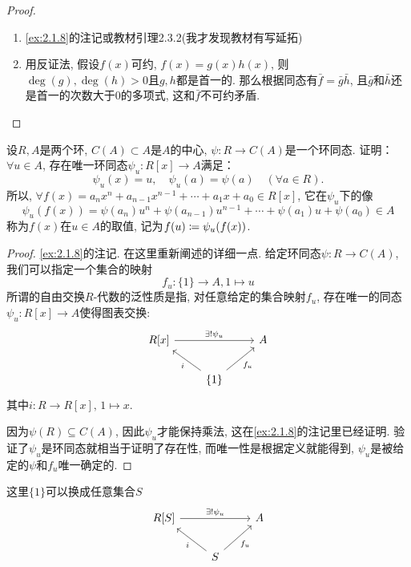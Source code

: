 \begin{proof}
    \begin{enumerate}[(1)]
        \item \ref{ex:2.1.8}的注记或教材引理2.3.2(我才发现教材有写延拓)
        \item 用反证法, 假设$f(x)$可约, $f(x) = g(x)h(x)$, 则$\deg(g), \deg(h) > 0$且$g, h$都是首一的. 那么根据同态有$\bar{f} = \bar{g}\bar{h}$, 且$\bar{g}$和$\bar{h}$还是首一的次数大于$0$的多项式, 这和$\bar{f}$不可约矛盾.
    \end{enumerate}
\end{proof}

\begin{problem}
    设$R, A$是两个环, $C(A) \subset A$是$A$的中心,
$\psi:R \to C(A)$是一个环同态. 证明：$\forall u \in A$,
存在唯一环同态$\psi_u:R[x] \to A$满足：
\[
    \psi_u(x) = u,\quad \psi_u(a) = \psi(a) \quad (\forall a \in R).
\]
所以, $\forall f(x) = a_nx^n + a_{n - 1}x^{n - 1} + \cdots + a_1x + a_0 \in R[x]$,
它在$\psi_u$下的像
\[
    \psi_u(f(x)) = \psi(a_n)u^n + \psi(a_{n - 1})u^{n - 1} + \cdots + \psi(a_1)u + \psi(a_0) \in A
\]
称为$f(x)$在$u \in A$的取值, 记为$f(u) \mathrel{\coloneqq} \psi_u(f(x))$.
\end{problem}

\begin{proof}
    \ref{ex:2.1.8}的注记. 在这里重新阐述的详细一点. 给定环同态$\psi:R \to C(A)$, 我们可以指定一个集合的映射
    \[
        f_u:\{1\} \to A, 1 \mapsto u
    \]
    所谓的自由交换$R$-代数的泛性质是指, 对任意给定的集合映射$f_u$, 存在唯一的同态$\psi_u:R[x] \to A$使得图表交换:
    \[
        \begin{tikzcd}
            {R[x]} \arrow[rr, "\exists!\psi_u"] &                                          & A \\
                                                & \{1\} \arrow[lu, "i"] \arrow[ru, "f_u"'] &  
        \end{tikzcd}
    \]
    其中$i:R \to R[x],\, 1 \mapsto x$.

    因为$\psi(R) \subseteq C(A)$, 因此$\psi_u$才能保持乘法, 这在\ref{ex:2.1.8}的注记里已经证明. 验证了$\psi_u$是环同态就相当于证明了存在性, 而唯一性是根据定义就能得到, $\psi_u$是被给定的$\psi$和$f_u$唯一确定的.
\end{proof}

\begin{remark}
    这里$\{1\}$可以换成任意集合$S$
\[
    \begin{tikzcd}
        {R[S]} \arrow[rr, "\exists!\psi_u"] &                                      & A \\
                                            & S \arrow[lu, "i"] \arrow[ru, "f_u"'] &  
        \end{tikzcd}
\]
\end{remark}

